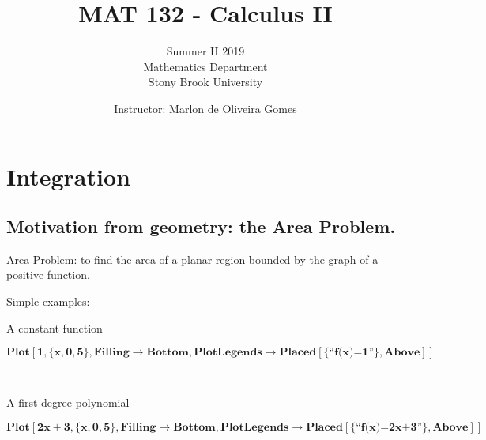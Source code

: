 \documentclass{article}
\begin{document}
\title{MAT 132 - Calculus II}
\author{Summer II 2019\\
Mathematics Department\\
Stony Brook University}
\date{Instructor: Marlon de Oliveira Gomes}
\maketitle

\section*{Integration}

\subsection*{Motivation from geometry: the Area Problem.}

Area Problem: to find the area of a planar region bounded by the graph of a positive function.

Simple examples:

A constant function

\begin{doublespace}
\noindent\(\pmb{\text{Plot}[1,\{x,0,5\}, \text{Filling}\to \text{Bottom}, \text{PlotLegends}\to \text{Placed}[\{\text{{``}f(x)=1{''}}\},\text{Above}]]}\)
\end{doublespace}

\begin{doublespace}
\noindent\(\begin{array}{c}
  \\
  \\
\end{array}\)
\end{doublespace}

A first-degree polynomial

\begin{doublespace}
\noindent\(\pmb{\text{Plot}[2x+3, \{x,0,5\}, \text{Filling}\to \text{Bottom}, \text{PlotLegends}\to \text{Placed}[\{\text{{``}f(x)=2x+3{''}}\}, \text{Above}]]}\)
\end{doublespace}

\begin{doublespace}
\noindent\(\begin{array}{c}
  \\
  \\
\end{array}\)
\end{doublespace}
\end{document}
